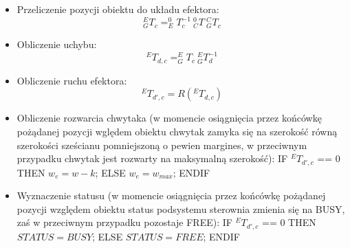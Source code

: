 \documentclass{article}
\begin{document}
\begin{itemize}
\begin{itemize}
\begin{itemize}
\item Przeliczenie pozycji obiektu do układu efektora: 
\[^E_GT_c = ^0_ET_c^{-1}~^0_CT~^C_GT_c\]
\item Obliczenie uchybu: 
\[^ET_{d,c}=^E_GT_c~^E_GT_d^{-1}\]
\item Obliczenie ruchu efektora:
\[^ET_{d',c}=R(^ET_{d,c})\]
\item Obliczenie rozwarcia chwytaka (w momencie osiągnięcia przez końcówkę pożądanej pozycji wględem obiektu chwytak zamyka się na szeroko\'sć równą szeroko\'sci sze\'scianu pomniejszoną o pewien margines, w przeciwnym przypadku chwytak jest rozwarty na maksymalną szeroko\'sć):
\newline
IF $^ET_{d',c}$ == 0 THEN \newline
$w_e = w-k$; \newline
ELSE \newline
$w_e = w_{max}$; \newline
ENDIF
\item Wyznaczenie statusu (w momencie osiągnięcia przez końcówkę pożądanej pozycji względem obiektu status podsystemu sterownia zmienia się na BUSY, za\'s w przeciwnym przypadku pozostaje FREE):
\newline
IF $^ET_{d',c}$ == 0 THEN \newline
$STATUS = BUSY$; \newline
ELSE \newline
$STATUS = FREE$; \newline
ENDIF
\end{itemize}
\end{itemize}


\end{itemize}
\end{document}
